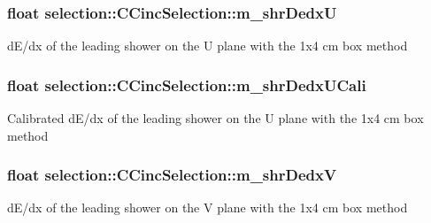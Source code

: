 \subsubsection[{\texorpdfstring{m\+\_\+shr\+DedxU}{m_shrDedxU}}]{\setlength{\rightskip}{0pt plus 5cm}float selection\+::\+C\+Cinc\+Selection\+::m\+\_\+shr\+DedxU\hspace{0.3cm}{\ttfamily [private]}}\hypertarget{classselection_1_1CCincSelection_a8874fb100e151832807ab459419e69d3}{}\label{classselection_1_1CCincSelection_a8874fb100e151832807ab459419e69d3}
d\+E/dx of the leading shower on the U plane with the 1x4 cm box method 
\subsubsection[{\texorpdfstring{m\+\_\+shr\+Dedx\+U\+Cali}{m_shrDedxUCali}}]{\setlength{\rightskip}{0pt plus 5cm}float selection\+::\+C\+Cinc\+Selection\+::m\+\_\+shr\+Dedx\+U\+Cali\hspace{0.3cm}{\ttfamily [private]}}\hypertarget{classselection_1_1CCincSelection_abd57a8d6290e142e526636a4ec851801}{}\label{classselection_1_1CCincSelection_abd57a8d6290e142e526636a4ec851801}
Calibrated d\+E/dx of the leading shower on the U plane with the 1x4 cm box method 
\subsubsection[{\texorpdfstring{m\+\_\+shr\+DedxV}{m_shrDedxV}}]{\setlength{\rightskip}{0pt plus 5cm}float selection\+::\+C\+Cinc\+Selection\+::m\+\_\+shr\+DedxV\hspace{0.3cm}{\ttfamily [private]}}\hypertarget{classselection_1_1CCincSelection_a2d1f501922cf14e3d1f6fb8cc8e63173}{}\label{classselection_1_1CCincSelection_a2d1f501922cf14e3d1f6fb8cc8e63173}
d\+E/dx of the leading shower on the V plane with the 1x4 cm box method 

